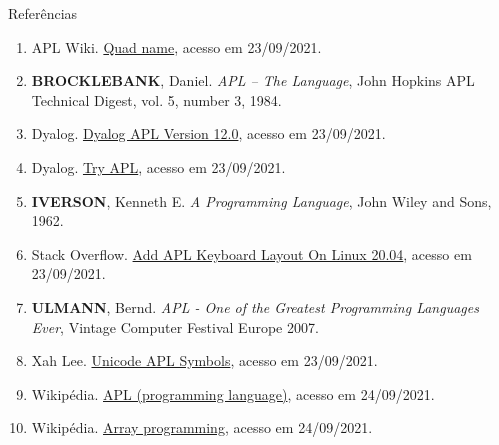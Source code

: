 \begin{frame}[fragile]{Referências}

    \begin{enumerate}
        \item APL Wiki. \href{https://aplwiki.com/wiki/Quad_name}{Quad name}, acesso em 23/09/2021.

        \item \textbf{BROCKLEBANK}, Daniel. \textit{APL -- The Language}, John Hopkins APL Technical Digest, vol. 5, number 3, 1984.

        \item Dyalog. \href{https://help.dyalog.com/12.0/index.html}{Dyalog APL Version 12.0}, acesso em 23/09/2021.

        \item Dyalog. \href{https://tryapl.org/}{Try APL}, acesso em 23/09/2021.
 
        \item \textbf{IVERSON}, Kenneth E. \textit{A Programming Language}, John Wiley and Sons, 1962.

        \item Stack Overflow. \href{https://stackoverflow.com/questions/68065520/add-apl-keyboard-layout-on-linux-20-04}{Add APL Keyboard Layout On Linux 20.04}, acesso em 23/09/2021.

        \item \textbf{ULMANN}, Bernd. \textit{APL - One of the Greatest Programming Languages Ever}, Vintage Computer Festival Europe 2007.

        \item Xah Lee. \href{http://xahlee.info/comp/unicode_APL_symbols.html}{Unicode APL Symbols}, acesso em 23/09/2021.

        \item Wikipédia. \href{https://en.wikipedia.org/wiki/APL_(programming_language)}{APL (programming language)}, acesso em 24/09/2021.

        \item Wikipédia. \href{https://en.wikipedia.org/wiki/Array_programming}{Array programming}, acesso em 24/09/2021.

    \end{enumerate}

\end{frame}

